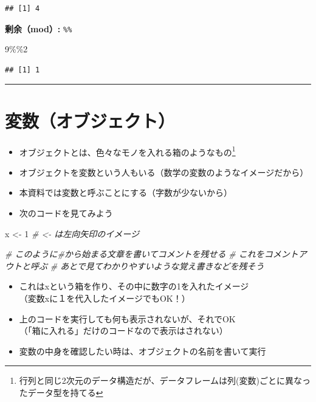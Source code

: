 \documentclass[
]{book}
\newenvironment{Shaded}{\begin{snugshade}}{\end{snugshade}}
\newcommand{\CommentTok}[1]{\textcolor[rgb]{0.56,0.35,0.01}{\textit{#1}}}
\newcommand{\DecValTok}[1]{\textcolor[rgb]{0.00,0.00,0.81}{#1}}
\newcommand{\NormalTok}[1]{#1}
\newcommand{\OtherTok}[1]{\textcolor[rgb]{0.56,0.35,0.01}{#1}}
\newcommand{\SpecialCharTok}[1]{\textcolor[rgb]{0.00,0.00,0.00}{#1}}
\providecommand{\tightlist}{%
  \setlength{\itemsep}{0pt}\setlength{\parskip}{0pt}}
\begin{document}
\begin{verbatim}
## [1] 4
\end{verbatim}

\textbf{剰余（mod）:} \texttt{\%\%}

\begin{Shaded}
\begin{Highlighting}[]
\DecValTok{9}\SpecialCharTok{\%\%}\DecValTok{2}
\end{Highlighting}
\end{Shaded}

\begin{verbatim}
## [1] 1
\end{verbatim}

\begin{center}\rule{0.5\linewidth}{0.5pt}\end{center}

\hypertarget{ux5909ux6570ux30aaux30d6ux30b8ux30a7ux30afux30c8}{%
\section{変数（オブジェクト）}\label{ux5909ux6570ux30aaux30d6ux30b8ux30a7ux30afux30c8}}

\begin{itemize}
\item
  オブジェクトとは、色々なモノを入れる箱のようなもの\footnote{行列と同じ2次元のデータ構造だが、データフレームは列(変数)ごとに異なったデータ型を持てる}\\
\item
  オブジェクトを変数という人もいる（数学の変数のようなイメージだから）
\item
  本資料では変数と呼ぶことにする（字数が少ないから）
\item
  次のコードを見てみよう
\end{itemize}

\begin{Shaded}
\begin{Highlighting}[]
\NormalTok{x }\OtherTok{\textless{}{-}} \DecValTok{1} \CommentTok{\# \textless{}{-} は左向矢印のイメージ}

\CommentTok{\# このように\#から始まる文章を書いてコメントを残せる}
\CommentTok{\# これをコメントアウトと呼ぶ}
\CommentTok{\# あとで見てわかりやすいような覚え書きなどを残そう}
\end{Highlighting}
\end{Shaded}

\begin{itemize}
\tightlist
\item
  これはxという箱を作り、その中に数字の1を入れたイメージ\\
  （変数xに１を代入したイメージでもOK！）
\item
  上のコードを実行しても何も表示されないが、それでOK\\
  （「箱に入れる」だけのコードなので表示はされない）
\item
  変数の中身を確認したい時は、オブジェクトの名前を書いて実行
\end{itemize}
\end{document}

